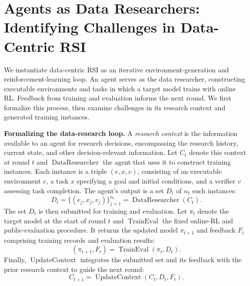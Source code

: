 \section{Agents as Data Researchers: Identifying Challenges in Data-Centric RSI}
\label{sec:evidencegaps}

We instantiate data-centric RSI as an iterative environment-generation and
reinforcement-learning loop. An agent serves as the data researcher,
constructing executable environments and tasks in which a target model trains
with online RL. Feedback from training and evaluation informs the next round.
We first formalize this process, then examine challenges in its research
context and generated training instances.

\textbf{Formalizing the data-research loop.}\quad
A \emph{research context} is the information available to an agent for
research decisions, encompassing the research history, current state, and
other decision-relevant information. Let $C_t$ denote this context at round
$t$ and $\operatorname{DataResearcher}$ the agent that uses it to construct
training instances. Each instance is a triple $(e,x,v)$, consisting of an
executable environment $e$, a task $x$ specifying a goal and initial
conditions, and a verifier $v$ assessing task completion. The agent's output
is a set $D_t$ of $n_t$ such instances:
\begingroup
\setlength{\abovedisplayskip}{8pt plus 2pt}
\setlength{\belowdisplayskip}{8pt plus 2pt}
\setlength{\abovedisplayshortskip}{8pt plus 2pt}
\setlength{\belowdisplayshortskip}{8pt plus 2pt}
\begin{equation}
\label{eq:researchoutput}
D_t=\{(e_j,x_j,v_j)\}_{j=1}^{n_t}
   =\operatorname{DataResearcher}(C_t).
\end{equation}
The set $D_t$ is then submitted for training and evaluation. Let $\pi_t$
denote the target model at the start of round $t$ and
$\operatorname{TrainEval}$ the fixed online-RL and public-evaluation
procedure. It returns the updated model $\pi_{t+1}$ and feedback $F_t$
comprising training records and evaluation results:
\begin{equation}
\label{eq:researchloop}
(\pi_{t+1},F_t)
= \operatorname{TrainEval}(\pi_t,D_t).
\end{equation}
Finally, $\operatorname{UpdateContext}$ integrates the submitted set and its
feedback with the prior research context to guide the next round:
\begin{equation}
\label{eq:contextupdate}
C_{t+1}=\operatorname{UpdateContext}(C_t,D_t,F_t).
\end{equation}
\endgroup

